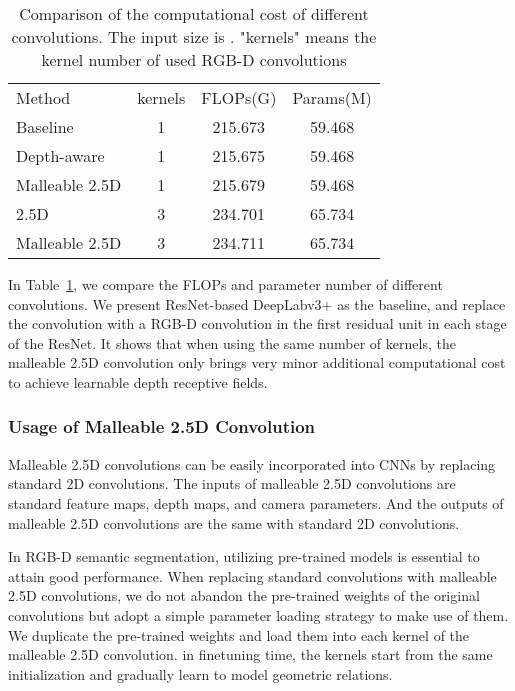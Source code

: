 \documentclass[runningheads]{llncs}
\begin{document}
\begin{table}[htbp]
  \begin{center}
  \caption{
  Comparison of the computational cost of different convolutions.
The input size is .
"kernels" means the kernel number of used RGB-D convolutions
  }
  \label{table:computation_cost}
  \setlength{\tabcolsep}{10pt}
  \begin{tabular}{lccc}
    \hline\noalign{\smallskip}
    Method & kernels & FLOPs(G) & Params(M)\\
    \noalign{\smallskip}
    \hline
    \noalign{\smallskip}
    Baseline                  & 1 & 215.673 & 59.468 \\
    \noalign{\smallskip}
    \hline
    \noalign{\smallskip}
    Depth-aware\cite{DepthAware}    & 1 & 215.675 & 59.468 \\
    Malleable 2.5D                    & 1 & 215.679 & 59.468 \\
    \noalign{\smallskip}
    \hline
    \noalign{\smallskip}
    2.5D\cite{2_5D}           & 3 & 234.701 & 65.734 \\
    Malleable 2.5D              & 3 & 234.711 & 65.734 \\
    \hline
  \end{tabular}
  \end{center}
\end{table}
In Table~\ref{table:computation_cost}, we compare the FLOPs and parameter number of different convolutions.
We present ResNet-based DeepLabv3+\cite{DeepLabv3plus} as the baseline, and replace the  convolution with a RGB-D convolution in the first residual unit in each stage of the ResNet.
It shows that when using the same number of kernels, the malleable 2.5D convolution only brings very minor additional computational cost to achieve learnable depth receptive fields.



\subsubsection{Usage of Malleable 2.5D Convolution}
Malleable 2.5D convolutions can be easily incorporated into CNNs by replacing standard 2D convolutions.
The inputs of malleable 2.5D convolutions are standard feature maps, depth maps, and camera parameters.
And the outputs of malleable 2.5D convolutions are the same with standard 2D convolutions.

In RGB-D semantic segmentation, utilizing pre-trained models is essential to attain good performance.
When replacing standard convolutions with malleable 2.5D convolutions, we do not abandon the pre-trained weights of the original convolutions but adopt a simple parameter loading strategy to make use of them.
We duplicate the pre-trained weights and load them into each kernel of the malleable 2.5D convolution.
in finetuning time, the  kernels start from the same initialization and gradually learn to model geometric relations.
\end{document}
